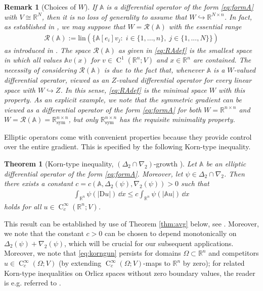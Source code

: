 \documentclass[a4paper,11pt]{amsart}
\numberwithin{equation}{section}
\newcommand{\R}{\mathbb{R}}
\newcommand{\hold}{\operatorname{C}}
\newtheorem{bem}[defi]{Remark}
\newtheorem{satz}[defi]{Theorem}
\begin{document}
	\begin{bem}[Choices of $W$]\label{rem:choiceofW}
		If $\mathbb{A}$ is a differential operator of the form \eqref{eq:formA} with $V\cong \R^{N}$, then it is no loss of generality to assume that $W\hookrightarrow \R^{N\times n}$. In fact, as established in \cite[Section 3]{contiFXG}, we may suppose that $W=\mathscr{R}(\mathbb{A})$ with the essential range 
		\begin{align}\label{eq:RAdef}
			\mathscr{R}(\mathbb{A}) := \mathrm{lin}(\{\mathbb{A}[e_{i}]v_{j}\colon\;i\in\{1,...,n\},\;j\in\{1,...,N\}\})
		\end{align}
		as introduced in \cite{BreitDieningGmeineder}. The space $\mathscr{R}(\mathbb{A})$ as given in \eqref{eq:RAdef} is the smallest space in which all values $\mathbb{A}v(x)$ for $v\in\hold^{1}(\R^{n};V)$ and $x\in\R^{n}$ are contained. The necessity of considering $\mathscr{R}(\mathbb{A})$ is due to the fact that, whenever $\mathbb{A}$ is a $W$-valued differential operator, viewed as an $Z$-valued differential operator for every linear space with $W\hookrightarrow Z$. In this sense, \eqref{eq:RAdef} is the minimal space $W$ with this property. As an explicit example, we note that the symmetric gradient can be viewed as a differential operator of the form \eqref{eq:formA} for both $W=\R^{n\times n}$ and $W=\mathscr{R}(\mathbb{A})=\mathbb{R}_{\mathrm{sym}}^{n\times n}$, but only $\mathbb{R}_{\mathrm{sym}}^{n\times n}$ has the requisite minimality property. 
	\end{bem}
	
	
	
	Elliptic operators come with convenient properties because they provide control over the entire gradient. This is specified by the following Korn-type  inequality. 
	\begin{satz}[Korn-type inequality, $(\Delta_{2}\cap\nabla_{2})$-growth {{\cite[Prop. 4.1]{contiFXG}}}] \label{thm:korn_uni} %
		Let $\mathbb{A}$ be an elliptic differential operator of the form \eqref{eq:formA}. Moreover, let $\psi\in\Delta_{2}\cap\nabla_{2}$. Then there exists a constant $c = c(\mathbb{A}, \Delta_2(\psi), \nabla_2(\psi)) > 0$ such that 
		\begin{align}\label{eq:korngun}
			\int_{\R^n} \psi(|\mathrm{D}u|) \, \dd{x} \leq c \int_{\R^n} \psi(|\mathbb{A}u|) \, \dd{x}
		\end{align}
		holds for all $u \in \hold_c^\infty(\R^n; V)$.
	\end{satz}
	This result can be established by use of Theorem \ref{thm:avg} below, see \cite{contiFXG}. Moreover, we note that the constant $c > 0$ can be chosen to depend monotonically on $\Delta_2(\psi) + \nabla_2(\psi)$, which will be crucial for our subsequent applications. Moreover, we note that \eqref{eq:korngun} persists for domains $\Omega\subset\R^{n}$ and competitors $u\in\hold_{c}^{\infty}(\Omega;V)$ (by extending $\hold_{c}^{\infty}(\Omega;V)$-maps to $\R^{n}$ by zero); for related Korn-type inequalities on Orlicz spaces without zero boundary values, the reader is e.g. referred to \cite{breit_sharp_2012,DieningGmeineder,diening_decomposition_2010}.
\end{document}
